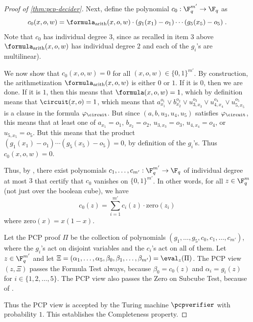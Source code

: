 \begin{proof}[Proof of \cref{thm:pcp-decider}]
Next, define the polynomial $c_0:\F_q^{m'} \rightarrow \F_q$ as
\begin{equation*}
  c_0(x, o, w) = \formula_{\mathrm{arith}} (x, o, w)
  \cdot (g_1(x_1) - o_1) \cdots (g_5(x_5)- o_5)\;.
\end{equation*}
Note that $c_0$ has individual degree $3$, since as recalled in item 3 above
$\formula_{\mathrm{arith}} (x, o, w)$ has individual degree $2$ and each of the
$g_i$'s are multilinear).
  
We now show that $c_0(x,o,w) = 0$ for all $(x,o,w) \in \{0,1\}^{m'}$.
By construction, the arithmetization $\formula_{\mathrm{arith}} (x, o, w)$ is
either $0$ or $1$.
If it is $0$, then we are done.
If it is $1$, then this means that $\formula(x,o,w) = 1$, which by definition
means that $\circuit(x,o) = 1$, which means that $a_{x_1}^{o_1} \lor
b_{x_2}^{o_2} \lor u_{3, x_3}^{o_3} \lor u_{4, x_4}^{o_4} \lor u_{5, x_5}^{o_5}$
is a clause in the formula $\varphi_\circuit$.
But since $(a,b,u_3,u_4,u_5)$ satisfies $\varphi_\circuit$, this means that at
least one of $a_{x_1} = o_1$, $b_{x_2} = o_2$, $u_{3,x_3} = o_3$, $u_{4,x_4} =
o_4$, or $u_{5,x_5} = o_5$.
But this means that the product $(g_1(x_1) - o_1) \cdots (g_5(x_5)- o_5) = 0$,
by definition of the $g_i$'s.
Thus $c_0(x,o,w) = 0$.
    
Thus, by , there exist polynomials $c_1,\ldots,c_{m'}:
\F_q^{m'} \to \F_q$ of individual degree at most $3$ that certify that $c_0$
vanishes on $\{0,1\}^{m'}$.
In other words, for all $z \in \F_q^m$ (not just over the boolean cube), we have
\begin{equation}
	\label{eq:restricted-to-subcube}
  c_0(z) = \sum_{i=1}^{m'} c_i(z) \cdot \mathrm{zero}(z_i)
\end{equation}
where $\mathrm{zero}(x) = x(1-x)$.
    
Let the PCP proof $\Pi$ be the collection of polynomials
$(g_1,\ldots,g_5,c_0,c_1,\ldots,c_{m'})$, where the $g_i$'s act on disjoint
variables and the $c_i$'s act on all of them.
Let $z \in \F_q^{m'}$ and let $\Xi =
(\alpha_1,\ldots,\alpha_5,\beta_0,\beta_1,\ldots,\beta_{m'}) = \eval_z(\Pi)$.
The PCP view $(z,\Xi)$ passes the Formula Test always, because $\beta_0 =
c_0(z)$ and $\alpha_i = g_i(z)$ for $i \in \{1,2,\ldots,5\}$.
The PCP view also passes the Zero on Subcube Test, because of
.
    
Thus the PCP view is accepted by the Turing machine $\pcpverifier$ with
probability $1$.
This establishes the Completeness property.
    

\end{proof}

